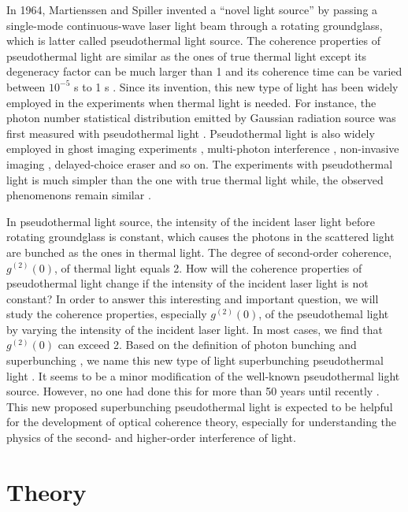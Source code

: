 \documentclass[12pt]{iopart}
\begin{document}
In 1964, Martienssen and Spiller invented a ``novel light source'' by passing a single-mode continuous-wave laser light beam through a rotating groundglass, which is latter called pseudothermal light source. The coherence properties of pseudothermal light are similar as the ones of true thermal light except its degeneracy factor can be much larger than 1 and its coherence time can be varied between $10^{-5}$ s to 1 s \cite{martienssen}. Since its invention, this new type of light has been widely employed in the experiments when thermal light is needed. For instance, the photon number statistical distribution emitted by Gaussian radiation source was first measured with pseudothermal light \cite{arecchi}. Pseudothermal light is also widely employed in ghost imaging experiments \cite{valencia,ferri,crosby}, multi-photon interference \cite{scarcelli,chen}, non-invasive imaging \cite{bertolotti,katz}, delayed-choice eraser \cite{peng} and so on.  The experiments with pseudothermal light is much simpler than the one with true thermal light while, the observed phenomenons remain similar \cite{valencia,wu-true}.

In pseudothermal light source, the intensity of the incident laser light before rotating groundglass is constant, which causes the photons in the scattered light are bunched as the ones in thermal light. The degree of second-order coherence, $g^{(2)}(0)$, of thermal light equals 2. How will the coherence properties of pseudothermal light change if the intensity of the incident laser light is not constant? In order to answer this interesting and important question, we will study the coherence properties, especially $g^{(2)}(0)$, of the pseudothemal light by varying the intensity of the incident laser light. In most cases, we find that $g^{(2)}(0)$ can exceed 2. Based on the definition of photon bunching and superbunching \cite{ficek}, we name this new type of light superbunching pseudothermal light \cite{zhou}. It seems to be a minor modification of the well-known pseudothermal light source. However, no one had done this for more than 50 years until recently \cite{zhou}. This new proposed superbunching pseudothermal light is expected to be helpful for the development of optical coherence theory, especially for understanding the physics of the second- and higher-order interference of light.

\section{Theory}
\end{document}
